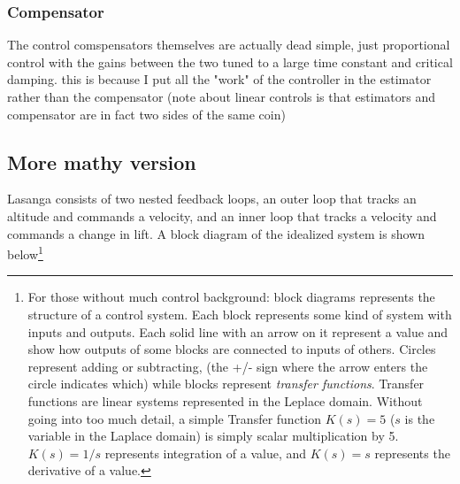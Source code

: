 \documentclass[11pt]{article}
\begin{document}
\subsubsection{Compensator}
The control comspensators themselves are actually dead simple, just proportional control with the gains between the two tuned to a large time constant and critical damping. this is because I put all the "work" of the controller in the estimator rather than the compensator (note about linear controls is that estimators and compensator are in fact two sides of the same coin)


\subsection{More mathy version}

Lasanga consists of two nested feedback loops, an outer loop that tracks an altitude and commands a velocity, and an inner loop that tracks a velocity and commands a change in lift. A block diagram of the idealized system is shown below\footnote{For those without much control background: block diagrams represents the structure of a control system. Each block represents some kind of system with inputs and outputs. Each solid line with an arrow on it represent a value and show how outputs of some blocks are connected to inputs of others. Circles represent adding or subtracting, (the +/- sign where the arrow enters the circle indicates which) while blocks represent \emph{transfer functions}. Transfer functions are linear systems represented in the Leplace domain. Without going into too much detail, a simple Transfer function $K(s) = 5$ ($s$ is the variable in the Laplace domain) is simply scalar multiplication by 5. $K(s) = 1/s$ represents integration of a value, and $K(s) = s$ represents the derivative of a value.}
\end{document}
